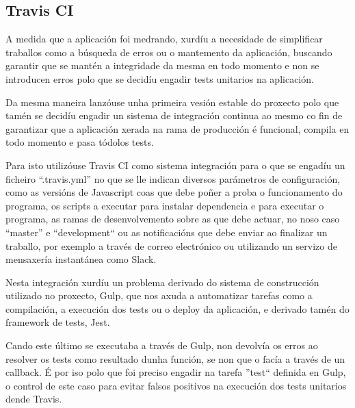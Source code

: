     \subsection{Travis CI}
    A medida que a aplicación foi medrando, xurdíu a necesidade de simplificar 
traballos como a búsqueda de erros ou o mantemento da aplicación, buscando 
garantir que se mantén a integridade da mesma en todo momento e non se 
introducen erros polo que se decidíu engadir tests unitarios na aplicación.

    Da mesma maneira lanzóuse unha primeira vesión estable do proxecto polo 
que tamén se decidíu engadir un sistema de integración continua ao mesmo co 
fin de garantizar que a aplicación xerada na rama de producción é funcional, 
compila en todo momento e pasa tódolos tests.

    Para isto utilizóuse Travis CI como sistema integración para o que se 
engadíu un ficheiro ``.travis.yml'' no que se lle indican diversos 
parámetros de configuración, como as versións de Javascript coas que debe poñer 
a proba o funcionamento do programa, os scripts a executar para instalar 
dependencia e para executar o programa, as ramas de desenvolvemento sobre as 
que debe actuar, no noso caso ``master'' e ``development`` ou as notificacións 
que debe enviar ao finalizar un traballo, por exemplo a través de correo 
electrónico ou utilizando un servizo de mensaxería instantánea como Slack.

    Nesta integración xurdíu un problema derivado do sistema de construcción 
utilizado no proxecto, Gulp, que nos axuda a automatizar tarefas como a 
compilación, a execución dos tests ou o deploy da aplicación, e derivado tamén 
do framework de tests, Jest.

    Cando este último se executaba a través de Gulp, non devolvía os 
erros ao resolver os tests como resultado dunha función, se non que o facía a 
través de un callback. É por iso polo que foi preciso engadir na tarefa 
''test`` definida en Gulp, o control de este caso para evitar falsos positivos 
na execución dos tests unitarios dende Travis.
